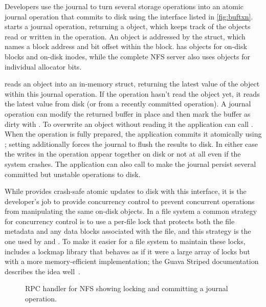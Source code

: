 Developers use the journal to turn several storage operations into an atomic journal operation that commits to disk using the \txn
interface listed in \autoref{fig:buftxn}.   starts a
journal operation, returning a  object, which keeps track of the
objects read or written in the operation.  An object is addressed by the
 struct, which names a block address and bit offset within the block. \simplenfs
has objects for on-disk blocks and on-disk inodes, while the
complete NFS server also uses objects for individual allocator bits.

 reads an object into an in-memory  struct, returning the latest value of the
object within this journal operation.  If the operation hasn't read the
object yet, it reads the latest value from disk (or from a recently
committed operation).  A journal operation can modify the returned buffer in place and
then mark the buffer as dirty with . To overwrite an object without
reading it the application can call . When the operation is
fully prepared, the application commits it atomically using ; setting
 additionally forces the journal to flush the results to disk.
In either case the writes in the operation appear together on disk or not at
all even if the system crashes. The application can also call  to
make the journal persist several committed but unstable operations to disk.

While \txn provides crash-safe atomic updates to disk with this interface, it is the developer's job
to provide concurrency control to prevent concurrent operations from manipulating
the same on-disk objects. In a file system a common strategy for concurrency
control is to use a per-file lock that protects both the file metadata and any
data blocks associated with the file, and this strategy is the one
used by \gnfs and \simplenfs.
To make it easier for a file system to maintain these locks,
\txn includes a lockmap library that behaves as if it were a large array of
locks but with a more memory-efficient implementation; the
Guava Striped documentation describes the idea well~\cite{guava-striped}.


\begin{figure}
  
  \vspace{-\baselineskip}
  \caption{RPC handler for NFS  showing locking and committing a
    journal operation.}
  \label{fig:nfswrite}
\end{figure}

